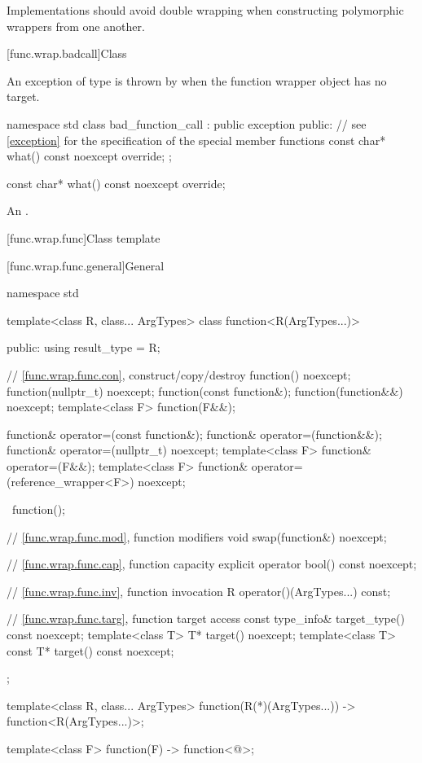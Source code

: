 \pnum
\recommended
Implementations should avoid double wrapping when
constructing polymorphic wrappers from one another.

[func.wrap.badcall]{Class }%
%

\pnum
An exception of type  is thrown by
when the function wrapper object has no target.

\begin{codeblock}
namespace std {
  class bad_function_call : public exception {
  public:
    // see \ref{exception} for the specification of the special member functions
    const char* what() const noexcept override;
  };
}
\end{codeblock}

%
\begin{itemdecl}
const char* what() const noexcept override;
\end{itemdecl}

\begin{itemdescr}
\pnum
\returns
An
 \ntbs{}.
\end{itemdescr}

[func.wrap.func]{Class template }

[func.wrap.func.general]{General}
%

%
\begin{codeblock}
namespace std {
  template<class R, class... ArgTypes>
  class function<R(ArgTypes...)> {
  public:
    using result_type = R;

    // \ref{func.wrap.func.con}, construct/copy/destroy
    function() noexcept;
    function(nullptr_t) noexcept;
    function(const function&);
    function(function&&) noexcept;
    template<class F> function(F&&);

    function& operator=(const function&);
    function& operator=(function&&);
    function& operator=(nullptr_t) noexcept;
    template<class F> function& operator=(F&&);
    template<class F> function& operator=(reference_wrapper<F>) noexcept;

    ~function();

    // \ref{func.wrap.func.mod}, function modifiers
    void swap(function&) noexcept;

    // \ref{func.wrap.func.cap}, function capacity
    explicit operator bool() const noexcept;

    // \ref{func.wrap.func.inv}, function invocation
    R operator()(ArgTypes...) const;

    // \ref{func.wrap.func.targ}, function target access
    const type_info& target_type() const noexcept;
    template<class T>       T* target() noexcept;
    template<class T> const T* target() const noexcept;
  };

  template<class R, class... ArgTypes>
    function(R(*)(ArgTypes...)) -> function<R(ArgTypes...)>;

  template<class F> function(F) -> function<@\seebelow@>;
}
\end{codeblock}

